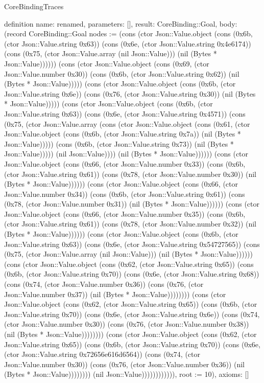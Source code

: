 \begin{lexlean}{CoreBindingTraces}
\begin{semanticmodule}
definition{
 name: renamed,
 parameters: [],
 result: CoreBinding::Goal,
 body: (record CoreBinding::Goal {nodes := (cons (ctor Json::Value.object (cons (0x6b, (ctor Json::Value.string 0x63)) (cons (0x6e, (ctor Json::Value.string 0x4e6174)) (cons (0x75, (ctor Json::Value.array (nil Json::Value))) (nil (Bytes * Json::Value)))))) (cons (ctor Json::Value.object (cons (0x69, (ctor Json::Value.number 0x30)) (cons (0x6b, (ctor Json::Value.string 0x62)) (nil (Bytes * Json::Value))))) (cons (ctor Json::Value.object (cons (0x6b, (ctor Json::Value.string 0x6e)) (cons (0x76, (ctor Json::Value.string 0x30)) (nil (Bytes * Json::Value))))) (cons (ctor Json::Value.object (cons (0x6b, (ctor Json::Value.string 0x63)) (cons (0x6e, (ctor Json::Value.string 0x4571)) (cons (0x75, (ctor Json::Value.array (cons (ctor Json::Value.object (cons (0x61, (ctor Json::Value.object (cons (0x6b, (ctor Json::Value.string 0x7a)) (nil (Bytes * Json::Value))))) (cons (0x6b, (ctor Json::Value.string 0x73)) (nil (Bytes * Json::Value))))) (nil Json::Value)))) (nil (Bytes * Json::Value)))))) (cons (ctor Json::Value.object (cons (0x66, (ctor Json::Value.number 0x33)) (cons (0x6b, (ctor Json::Value.string 0x61)) (cons (0x78, (ctor Json::Value.number 0x30)) (nil (Bytes * Json::Value)))))) (cons (ctor Json::Value.object (cons (0x66, (ctor Json::Value.number 0x34)) (cons (0x6b, (ctor Json::Value.string 0x61)) (cons (0x78, (ctor Json::Value.number 0x31)) (nil (Bytes * Json::Value)))))) (cons (ctor Json::Value.object (cons (0x66, (ctor Json::Value.number 0x35)) (cons (0x6b, (ctor Json::Value.string 0x61)) (cons (0x78, (ctor Json::Value.number 0x32)) (nil (Bytes * Json::Value)))))) (cons (ctor Json::Value.object (cons (0x6b, (ctor Json::Value.string 0x63)) (cons (0x6e, (ctor Json::Value.string 0x54727565)) (cons (0x75, (ctor Json::Value.array (nil Json::Value))) (nil (Bytes * Json::Value)))))) (cons (ctor Json::Value.object (cons (0x62, (ctor Json::Value.string 0x65)) (cons (0x6b, (ctor Json::Value.string 0x70)) (cons (0x6e, (ctor Json::Value.string 0x68)) (cons (0x74, (ctor Json::Value.number 0x36)) (cons (0x76, (ctor Json::Value.number 0x37)) (nil (Bytes * Json::Value)))))))) (cons (ctor Json::Value.object (cons (0x62, (ctor Json::Value.string 0x65)) (cons (0x6b, (ctor Json::Value.string 0x70)) (cons (0x6e, (ctor Json::Value.string 0x6e)) (cons (0x74, (ctor Json::Value.number 0x30)) (cons (0x76, (ctor Json::Value.number 0x38)) (nil (Bytes * Json::Value)))))))) (cons (ctor Json::Value.object (cons (0x62, (ctor Json::Value.string 0x65)) (cons (0x6b, (ctor Json::Value.string 0x70)) (cons (0x6e, (ctor Json::Value.string 0x72656e616d6564)) (cons (0x74, (ctor Json::Value.number 0x30)) (cons (0x76, (ctor Json::Value.number 0x36)) (nil (Bytes * Json::Value)))))))) (nil Json::Value)))))))))))), root := 10}),
 axioms: []
}


\end{semanticmodule}
\end{lexlean}

